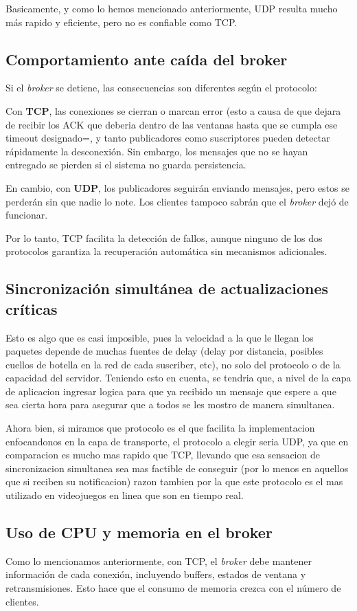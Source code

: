 \documentclass[10pt]{article}
\begin{document}
Basicamente, y como lo hemos mencionado anteriormente, UDP resulta mucho más rapido y eficiente, pero no es confiable como TCP.

\subsection{Comportamiento ante caída del broker}
Si el \textit{broker} se detiene, las consecuencias son diferentes según el protocolo:

Con \textbf{TCP}, las conexiones se cierran o marcan error (esto a causa de que dejara de recibir los ACK que deberia dentro de las ventanas hasta que se cumpla ese timeout designado=, y tanto publicadores como suscriptores pueden detectar rápidamente la desconexión. Sin embargo, los mensajes que no se hayan entregado se pierden si el sistema no guarda persistencia.

En cambio, con \textbf{UDP}, los publicadores seguirán enviando mensajes, pero estos se perderán sin que nadie lo note. Los clientes tampoco sabrán que el \textit{broker} dejó de funcionar.

Por lo tanto, TCP facilita la detección de fallos, aunque ninguno de los dos protocolos garantiza la recuperación automática sin mecanismos adicionales.

\subsection{Sincronización simultánea de actualizaciones críticas}
Esto es algo que es casi imposible, pues la velocidad a la que le llegan los paquetes depende de muchas fuentes de delay (delay por distancia, posibles cuellos de botella en la red de cada suscriber, etc), no solo del protocolo o de la capacidad del servidor. Teniendo esto en cuenta, se tendria que, a nivel de la capa de aplicacion ingresar logica para que ya recibido un mensaje que espere a que sea cierta hora para asegurar que a todos se les mostro de manera simultanea. 

Ahora bien, si miramos que protocolo es el que facilita la implementacion enfocandonos en la capa de transporte, el protocolo a elegir seria UDP, ya que en comparacion es mucho mas rapido que TCP, llevando que esa sensacion de sincronizacion simultanea sea mas factible de conseguir (por lo menos en aquellos que si reciben su notificacion) razon tambien por la que este protocolo es el mas utilizado en videojuegos en linea que son en tiempo real. 

\subsection{Uso de CPU y memoria en el broker}
Como lo mencionamos anteriormente, con TCP, el \textit{broker} debe mantener información de cada conexión, incluyendo buffers, estados de ventana y retransmisiones. Esto hace que el consumo de memoria crezca con el número de clientes. 
\end{document}
